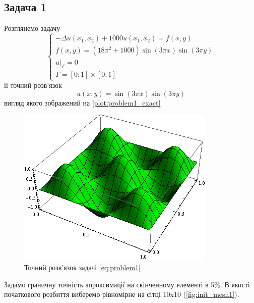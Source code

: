 
\subsection{Задача 1}

Розглянемо задачу
\begin{equation}\label{eq:problem1}
\begin{cases}
	- \Delta u(x_1,x_2) + 1000u(x_1, x_2) = f(x,y) \\
	f(x,y) = (18 \pi^2 +1000)\sin(3 \pi x) \sin (3 \pi y) \\
	u|_\Gamma = 0 \\
	\Gamma = \left[0;1\right] \times \left[0;1\right]
\end{cases}
\end{equation}
її точний розв'язок
\begin{equation}
	u(x,y) = \sin(3 \pi x) \sin (3 \pi y)
\end{equation}
вигляд якого зображений на \autoref{plot:problem1_exact}
\begin{figure}[H]
	\centering
    \includegraphics[scale=1.0]{problem1/ExactSolution}
    \caption{Точний розв'язок задачі \eqref{eq:problem1}}
    \label{plot:problem1_exact}
\end{figure}
Задамо граничну точність апроксимації на скінченному елементі в 5\%.
В якості початкового розбиття виберемо рівномірне на сітці 10x10 (\autoref{fig:init_mesh1}).
